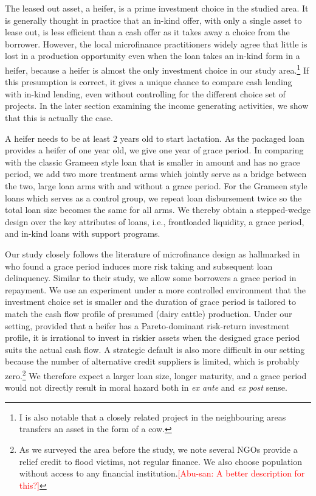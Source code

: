 	The leased out asset, a heifer, is a prime investment choice in the studied area. It is generally thought in practice that an in-kind offer, with only a single asset to lease out, is less efficient than a cash offer as it takes away a choice from the borrower. However, the local microfinance practitioners widely agree that little is lost in a production opportunity even when the loan takes an in-kind form in a heifer, because a heifer is almost the only investment choice in our study area.\footnote{I is also notable that a closely related project in the neighbouring areas transfers an asset in the form of a cow\citep{BandieraBRAC2017}. } If this presumption is correct, it gives a unique chance to compare cash lending with in-kind lending, even without controlling for the different choice set of projects. In the later section examining the income generating activities, we show that this is actually the case.
	
	A heifer needs to be at least 2 years old to start lactation. As the packaged loan provides a heifer of one year old, we give one year of grace period. In comparing with the classic Grameen style loan that is smaller in amount and has no grace period, we add two more treatment arms which jointly serve as a bridge between the two, large loan arms with and without a grace period. For the Grameen style loans which serves as a control group, we repeat loan disbursement twice so the total loan size becomes the same for all arms. We thereby obtain a stepped-wedge design over the key attributes of loans, i.e., frontloaded liquidity, a grace period, and in-kind loans with support programs.

	Our study closely follows the literature of microfinance design as hallmarked in \citet{Field2013} who found a grace period induces more risk taking and subsequent loan delinquency. Similar to their study, we allow some borrowers a grace period in repayment. We use an experiment under a more controlled environment that the investment choice set is smaller and the duration of grace period is tailored to match the cash flow profile of presumed (dairy cattle) production. Under our setting, provided that a heifer has a Pareto-dominant risk-return investment profile, it is irrational to invest in riskier assets when the designed grace period suits the actual cash flow. A strategic default is also more difficult in our setting because the number of alternative credit suppliers is limited, which is probably zero.\footnote{As we surveyed the area before the study, we note several NGOs provide a relief credit to flood victims, not regular finance. We also choose population without access to any financial institution.\textcolor{red}{[Abu-san: A better description for this?]} } We therefore expect a larger loan size, longer maturity, and a grace period would not directly result in moral hazard both in \textit{ex ante} and \textit{ex post} sense. 

